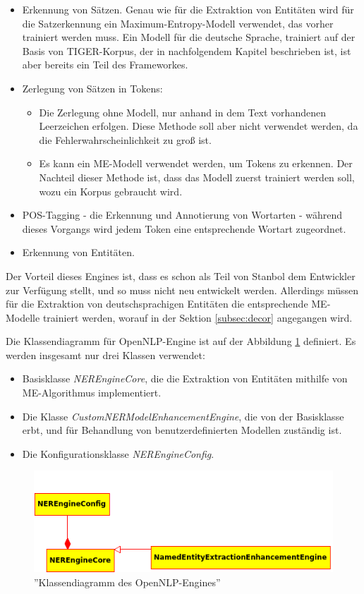 \begin{itemize}
\item Erkennung von Sätzen. Genau wie für die Extraktion von Entitäten wird für die Satzerkennung ein Maximum-Entropy-Modell verwendet, das vorher trainiert werden muss. Ein Modell für die deutsche Sprache, trainiert auf der Basis von TIGER-Korpus, der in nachfolgendem Kapitel beschrieben ist, ist aber bereits ein Teil des Frameworkes.
\item Zerlegung von Sätzen in Tokens:
\begin{itemize}
\item Die Zerlegung ohne Modell, nur anhand in dem Text vorhandenen Leerzeichen erfolgen. Diese Methode soll aber nicht verwendet werden, da die Fehlerwahrscheinlichkeit zu groß ist.
\item Es kann ein ME-Modell verwendet werden, um Tokens zu erkennen. Der Nachteil dieser Methode ist, dass das Modell zuerst trainiert werden soll, wozu ein Korpus gebraucht wird.
\end{itemize}
\item POS-Tagging - die Erkennung und Annotierung von Wortarten - während dieses Vorgangs wird jedem Token eine entsprechende Wortart zugeordnet.
\item Erkennung von Entitäten.
\end{itemize}

Der Vorteil dieses Engines ist, dass es schon als Teil von Stanbol dem Entwickler zur Verfügung stellt, und so muss nicht neu entwickelt werden. Allerdings müssen für die Extraktion von deutschsprachigen Entitäten die entsprechende ME-Modelle trainiert werden, worauf in der Sektion \ref{subsec:decor} angegangen wird.

Die Klassendiagramm für OpenNLP-Engine ist auf der Abbildung \ref{fig:onlpuml} definiert. Es werden insgesamt nur drei Klassen verwendet:
\begin{itemize}
\item Basisklasse \textit{NEREngineCore}, die die Extraktion von Entitäten mithilfe von ME-Algorithmus implementiert.
\item Die Klasse \textit{CustomNERModelEnhancementEngine}, die von der Basisklasse erbt, und für Behandlung von benutzerdefinierten Modellen zuständig ist.
\item Die Konfigurationsklasse \textit{NEREngineConfig}.
\end{itemize}

\begin{figure}[ht]
\centering
\includegraphics[width=\textwidth]{Bilder/onlp-classes.png}
\caption{''Klassendiagramm  des OpenNLP-Engines''}
\label{fig:onlpuml}
\end{figure}

